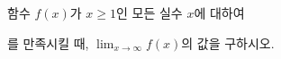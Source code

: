 함수 $f(x)$가 $x\ge 1$인 모든 실수 $x$에 대하여 \par\smallskip{}\par\smallskip\noindent 를 만족시킬 때, $\displaystyle\lim_{x\to\infty}f(x)$의 값을 구하시오.
